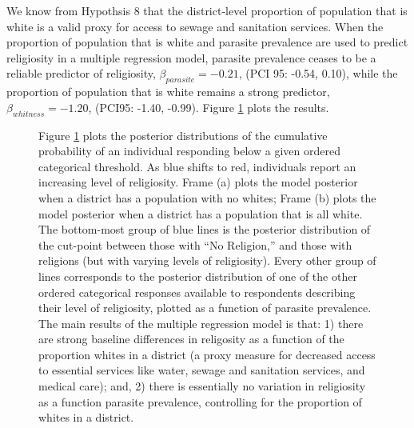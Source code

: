 \documentclass[12pt]{article}
\begin{document}
	We know from Hypothsis 8 that the district-level proportion of population that is white is a valid proxy for access to  sewage and sanitation services.  When the proportion of population that is white and parasite prevalence are used to predict religiosity in a multiple regression model, parasite prevalence ceases to be a reliable predictor of religiosity, $\beta_{parasite}=-0.21 $, (PCI 95: -0.54, 0.10), while the proportion of population that is white remains a strong predictor, $\beta_{whitness}= -1.20$, (PCI95: -1.40, -0.99). Figure \ref{ALubWhitenessAndReligModel} plots the results.\\
\begin{figure}
    \centering
    \caption {Figure \ref{ALubWhitenessAndReligModel} plots the posterior distributions of the cumulative probability of an individual responding below a given ordered categorical threshold. As blue shifts to red, individuals report an increasing level of religiosity. Frame (a) plots the model posterior when a district has a population with no whites; Frame (b) plots the model posterior when a district has a population that is all white. The bottom-most group of blue lines is the posterior distribution of the cut-point between those with ``No Religion,'' and those with religions (but with varying levels of religiosity). Every other group of lines corresponds to the posterior distribution of one of the other ordered categorical responses available to respondents describing their level of religiosity, plotted as a function of parasite prevalence.  The main results of the multiple regression model is that: 1) there are strong baseline differences in religosity as a function of the proportion whites in a district (a proxy measure for decreased access to essential services like water, sewage and sanitation services, and medical care); and, 2) there is essentially no variation in religiosity as a function parasite prevalence, controlling for the proportion of whites in a district. }  \label{ALubWhitenessAndReligModel}
\end{figure}
\end{document}
